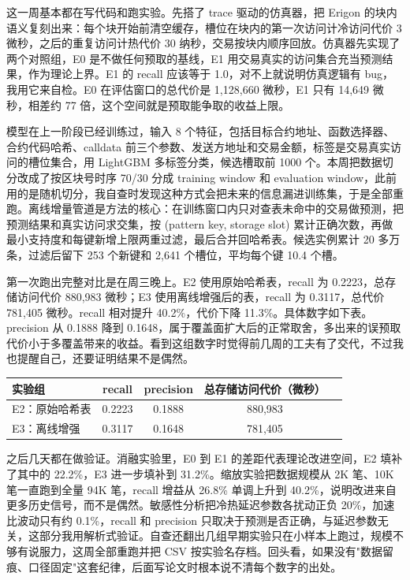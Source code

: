 \documentclass[UTF8,fontset=fandol]{ctexart}
\begin{document}

这一周基本都在写代码和跑实验。先搭了 trace 驱动的仿真器，把 Erigon 的块内语义复刻出来：每个块开始前清空缓存，槽位在块内的第一次访问计冷访问代价 3 微秒，之后的重复访问计热代价 30 纳秒，交易按块内顺序回放。仿真器先实现了两个对照组，E0 是不做任何预取的基线，E1 用交易真实的访问集合充当预测结果，作为理论上界。E1 的 recall 应该等于 1.0，对不上就说明仿真逻辑有 bug，我用它来自检。E0 在评估窗口的总代价是 1,128,660 微秒，E1 只有 14,649 微秒，相差约 77 倍，这个空间就是预取能争取的收益上限。

模型在上一阶段已经训练过，输入 8 个特征，包括目标合约地址、函数选择器、合约代码哈希、calldata 前三个参数、发送方地址和交易金额，标签是交易真实访问的槽位集合，用 LightGBM 多标签分类，候选槽取前 1000 个。本周把数据切分改成了按区块号时序 70/30 分成 training window 和 evaluation window，此前用的是随机切分，我自查时发现这种方式会把未来的信息漏进训练集，于是全部重跑。离线增量管道是方法的核心：在训练窗口内只对查表未命中的交易做预测，把预测结果和真实访问求交集，按 (pattern key, storage slot) 累计正确次数，再做最小支持度和每键新增上限两重过滤，最后合并回哈希表。候选实例累计 20 多万条，过滤后留下 253 个新键和 2,641 个槽位，平均每个键 10.4 个槽。

第一次跑出完整对比是在周三晚上。E2 使用原始哈希表，recall 为 0.2223，总存储访问代价 880,983 微秒；E3 使用离线增强后的表，recall 为 0.3117，总代价 781,405 微秒。recall 相对提升 40.2\%，代价下降 11.3\%。具体数字如下表。precision 从 0.1888 降到 0.1648，属于覆盖面扩大后的正常取舍，多出来的误预取代价小于多覆盖带来的收益。看到这组数字时觉得前几周的工夫有了交代，不过我也提醒自己，还要证明结果不是偶然。

\begin{table}[h]
\centering
\begin{tabular}{lcccc}
\toprule
实验组 & recall & precision & 总存储访问代价（微秒）\\
\midrule
E2：原始哈希表 & 0.2223 & 0.1888 & 880,983 \\
E3：离线增强 & 0.3117 & 0.1648 & 781,405 \\
\bottomrule
\end{tabular}
\end{table}

之后几天都在做验证。消融实验里，E0 到 E1 的差距代表理论改进空间，E2 填补了其中的 22.2\%，E3 进一步填补到 31.2\%。缩放实验把数据规模从 2K 笔、10K 笔一直跑到全量 94K 笔，recall 增益从 26.8\% 单调上升到 40.2\%，说明改进来自更多历史信号，而不是偶然。敏感性分析把冷热延迟参数各扰动正负 20\%，加速比波动只有约 0.1\%，recall 和 precision 只取决于预测是否正确，与延迟参数无关，这部分我用解析式验证。自查还翻出几组早期实验只在小样本上跑过，规模不够有说服力，这周全部重跑并把 CSV 按实验名存档。回头看，如果没有"数据留痕、口径固定"这套纪律，后面写论文时根本说不清每个数字的出处。
\end{document}
